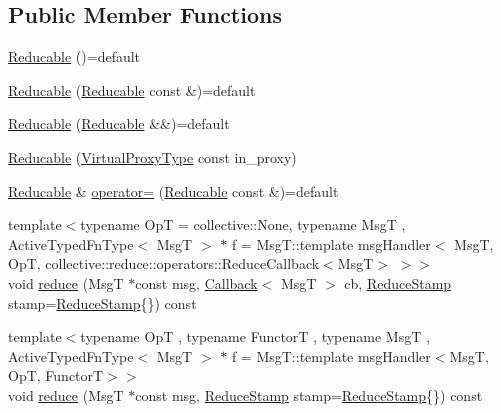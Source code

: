 \subsection*{Public Member Functions}
\begin{DoxyCompactItemize}
\item 
\hyperlink{structvt_1_1vrt_1_1collection_1_1_reducable_a807b462380873448bfcf4661b4b28a2d}{Reducable} ()=default
\item 
\hyperlink{structvt_1_1vrt_1_1collection_1_1_reducable_aafc682961c7c961547d91358cda46792}{Reducable} (\hyperlink{structvt_1_1vrt_1_1collection_1_1_reducable}{Reducable} const \&)=default
\item 
\hyperlink{structvt_1_1vrt_1_1collection_1_1_reducable_a4c5250ba5364ae0965c119773e87f4e8}{Reducable} (\hyperlink{structvt_1_1vrt_1_1collection_1_1_reducable}{Reducable} \&\&)=default
\item 
\hyperlink{structvt_1_1vrt_1_1collection_1_1_reducable_a658b587cdafda69c95ad0a2efe7a73fe}{Reducable} (\hyperlink{namespacevt_a1b417dd5d684f045bb58a0ede70045ac}{Virtual\+Proxy\+Type} const in\+\_\+proxy)
\item 
\hyperlink{structvt_1_1vrt_1_1collection_1_1_reducable}{Reducable} \& \hyperlink{structvt_1_1vrt_1_1collection_1_1_reducable_a7df8661d0e353935f034c4c0174c0872}{operator=} (\hyperlink{structvt_1_1vrt_1_1collection_1_1_reducable}{Reducable} const \&)=default
\item 
{\footnotesize template$<$typename OpT  = collective\+::\+None, typename MsgT , Active\+Typed\+Fn\+Type$<$ Msg\+T $>$ $\ast$ f = Msg\+T\+::template msg\+Handler$<$      Msg\+T, Op\+T, collective\+::reduce\+::operators\+::\+Reduce\+Callback$<$\+Msg\+T$>$    $>$$>$ }\\void \hyperlink{structvt_1_1vrt_1_1collection_1_1_reducable_a01c048ad987be949f4c2eebf3b71e4a5}{reduce} (MsgT $\ast$const msg, \hyperlink{namespacevt_a36db99df4c973d48b1118a293fff533f}{Callback}$<$ MsgT $>$ cb, \hyperlink{structvt_1_1vrt_1_1collection_1_1_reducable_a19f80baf23f36dad4948ef07322fd0cb}{Reduce\+Stamp} stamp=\hyperlink{structvt_1_1vrt_1_1collection_1_1_reducable_a19f80baf23f36dad4948ef07322fd0cb}{Reduce\+Stamp}\{\}) const
\item 
{\footnotesize template$<$typename OpT , typename FunctorT , typename MsgT , Active\+Typed\+Fn\+Type$<$ Msg\+T $>$ $\ast$ f = Msg\+T\+::template msg\+Handler$<$\+Msg\+T, Op\+T, Functor\+T$>$$>$ }\\void \hyperlink{structvt_1_1vrt_1_1collection_1_1_reducable_a627f3a970578d49ee53b6afe5a6f02b2}{reduce} (MsgT $\ast$const msg, \hyperlink{structvt_1_1vrt_1_1collection_1_1_reducable_a19f80baf23f36dad4948ef07322fd0cb}{Reduce\+Stamp} stamp=\hyperlink{structvt_1_1vrt_1_1collection_1_1_reducable_a19f80baf23f36dad4948ef07322fd0cb}{Reduce\+Stamp}\{\}) const

\end{DoxyCompactItemize}
